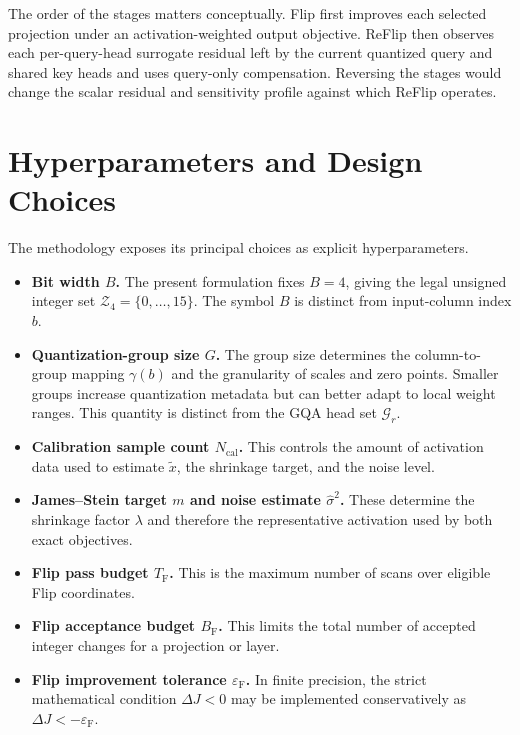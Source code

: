 The order of the stages matters conceptually. Flip first improves each selected projection under an activation-weighted output objective. ReFlip then observes each per-query-head surrogate residual left by the current quantized query and shared key heads and uses query-only compensation. Reversing the stages would change the scalar residual and sensitivity profile against which ReFlip operates.

\section{Hyperparameters and Design Choices}

The methodology exposes its principal choices as explicit hyperparameters.

\begin{itemize}
\item \textbf{Bit width $B$.} The present formulation fixes $B=4$, giving the legal unsigned integer set $\mathcal{Z}_4=\{0,\ldots,15\}$. The symbol $B$ is distinct from input-column index $b$.

\item \textbf{Quantization-group size $G$.} The group size determines the column-to-group mapping $\gamma(b)$ and the granularity of scales and zero points. Smaller groups increase quantization metadata but can better adapt to local weight ranges. This quantity is distinct from the GQA head set $\mathcal{G}_r$.

\item \textbf{Calibration sample count $N_{\mathrm{cal}}$.} This controls the amount of activation data used to estimate $\tilde{x}$, the shrinkage target, and the noise level.

\item \textbf{James--Stein target $m$ and noise estimate $\hat{\sigma}^2$.} These determine the shrinkage factor $\lambda$ and therefore the representative activation used by both exact objectives.

\item \textbf{Flip pass budget $T_{\mathrm{F}}$.} This is the maximum number of scans over eligible Flip coordinates.

\item \textbf{Flip acceptance budget $B_{\mathrm{F}}$.} This limits the total number of accepted integer changes for a projection or layer.

\item \textbf{Flip improvement tolerance $\varepsilon_{\mathrm{F}}$.} In finite precision, the strict mathematical condition $\Delta J<0$ may be implemented conservatively as $\Delta J<-\varepsilon_{\mathrm{F}}$.


\end{itemize}
